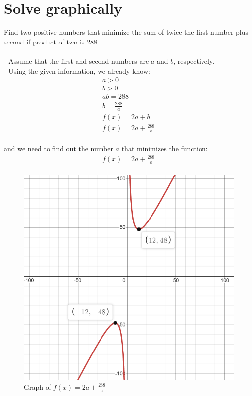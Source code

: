 \documentclass {article}
\begin{document}
\section{Solve graphically}
Find two positive numbers that minimize the sum of twice the first number plus second if product of two is 288.\\
\\
- Assume that the first and second numbers are $a$ and $b$, respectively.\\
- Using the given information, we already know:\\ 

\begin{align*}
	a > 0 \\
	b > 0 \\
	ab = 288 \\
	b=\frac{288}{a} \\
	f(x)= 2a + b \\
	f(x)= 2a + \frac{288}{a} \\
\end{align*}

and we need to find out the number $a$ that minimizes the function:\\

\begin{align*}
	f(x)= 2a + \frac{288}{a} \\
\end{align*}

\begin{figure}
  \includegraphics[width=\linewidth]{graph1.png}
  \caption{Graph of $f(x)= 2a + \frac{288}{a}$}
\end{figure}
\end{document}

